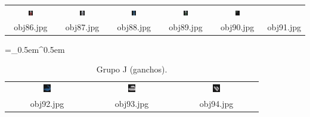 \begin{table}[H]
\begin{tabu}{|cccccc|}
    \includegraphics[width=0.1\textwidth,height=0.1\textwidth]{imagens/coil_100/embalagens_tampas/obj61__0.png} &
    \includegraphics[width=0.1\textwidth,height=0.1\textwidth]{imagens/coil_100/embalagens_tampas/obj64__0.png} &
    \includegraphics[width=0.1\textwidth,height=0.1\textwidth]{imagens/coil_100/embalagens_tampas/obj88__0.png} &
    \includegraphics[width=0.1\textwidth,height=0.1\textwidth]{imagens/coil_100/embalagens_tampas/obj92__0.png} &
    \includegraphics[width=0.1\textwidth,height=0.1\textwidth]{imagens/coil_100/embalagens_tampas/obj92__0_1.png}
    \\
    \scriptsize{obj86.jpg} & \scriptsize{obj87.jpg} & \scriptsize{obj88.jpg} &
    \scriptsize{obj89.jpg} & \scriptsize{obj90.jpg} & \scriptsize{obj91.jpg}
  \end{tabu}
\end{table}

\begin{table}[H]
  \centering
  \caption{Grupo J (ganchos).}
  \tabulinesep =_0.5em^0.5em
  \everyrow{\tabucline[0.4pt]-}
  \begin{tabu}{|ccc|}
    \includegraphics[width=0.1\textwidth,height=0.1\textwidth]{imagens/coil_100/ganchos/obj36__0.png} &
    \includegraphics[width=0.1\textwidth,height=0.1\textwidth]{imagens/coil_100/ganchos/obj85__0.png} &
    \includegraphics[width=0.1\textwidth,height=0.1\textwidth]{imagens/coil_100/ganchos/obj85__0_1.png}
    \\
    \scriptsize{obj92.jpg} & \scriptsize{obj93.jpg} & \scriptsize{obj94.jpg}
  \end{tabu}
\end{table}

